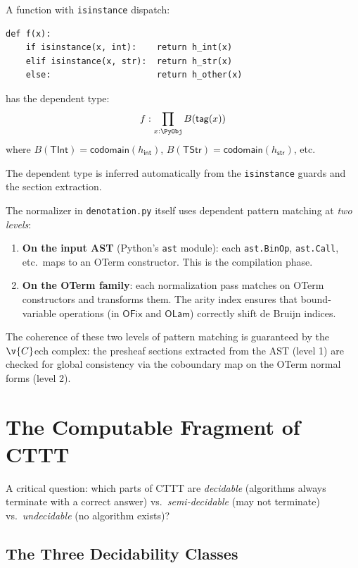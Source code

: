 \begin{theorem}
\label{thm:isinstance-dep}
A function with \texttt{isinstance} dispatch:
\begin{lstlisting}
def f(x):
    if isinstance(x, int):    return h_int(x)
    elif isinstance(x, str):  return h_str(x)
    else:                     return h_other(x)
\end{lstlisting}
has the dependent type:
\[
  f : \prod_{x : \PyObj} B(\mathsf{tag}(x))
\]
where $B(\mathsf{TInt}) = \mathsf{codomain}(h_\mathsf{int})$,
$B(\mathsf{TStr}) = \mathsf{codomain}(h_\mathsf{str})$, etc.

The dependent type is inferred automatically from the \texttt{isinstance}
guards and the section extraction.
\end{theorem}

\begin{remark}
The normalizer in \texttt{denotation.py} itself uses dependent pattern
matching at \emph{two levels}:
\begin{enumerate}
  \item \textbf{On the input AST} (Python's \texttt{ast} module):
    each \texttt{ast.BinOp}, \texttt{ast.Call}, etc.\ maps to an
    OTerm constructor.  This is the compilation phase.
  \item \textbf{On the OTerm family}: each normalization pass
    matches on OTerm constructors and transforms them.  The arity
    index ensures that bound-variable operations (in $\mathsf{OFix}$
    and $\mathsf{OLam}$) correctly shift de Bruijn indices.
\end{enumerate}
The coherence of these two levels of pattern matching is guaranteed
by the $\v{C}$ech complex: the presheaf sections extracted from the
AST (level 1) are checked for global consistency via the coboundary
map on the OTerm normal forms (level 2).
\end{remark}


\chapter{The Computable Fragment of CTTT}
\label{ch:computable}

A critical question: which parts of CTTT are \emph{decidable}
(algorithms always terminate with a correct answer) vs.\
\emph{semi-decidable} (may not terminate) vs.\ \emph{undecidable}
(no algorithm exists)?

\section{The Three Decidability Classes}

